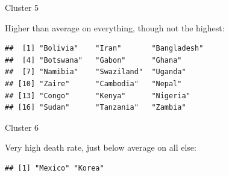 \begin{frame}[fragile]{Cluster 5}

  Higher than average on everything, though not the highest:
  
\begin{knitrout}
\color{fgcolor}\begin{kframe}
\begin{alltt}
\hlstd{(vital.s,country[clus6}\hlopt{==}\hlstd{])}
\end{alltt}
\begin{verbatim}
##  [1] "Bolivia"    "Iran"       "Bangladesh"
##  [4] "Botswana"   "Gabon"      "Ghana"     
##  [7] "Namibia"    "Swaziland"  "Uganda"    
## [10] "Zaire"      "Cambodia"   "Nepal"     
## [13] "Congo"      "Kenya"      "Nigeria"   
## [16] "Sudan"      "Tanzania"   "Zambia"
\end{verbatim}
\end{kframe}
\end{knitrout}
  
\end{frame}
\begin{frame}[fragile]{Cluster 6}

    Very high death rate, just below average on all else:

  
\begin{knitrout}
\color{fgcolor}\begin{kframe}
\begin{alltt}
\hlstd{(vital.s,country[clus6}\hlopt{==}\hlstd{])}
\end{alltt}
\begin{verbatim}
## [1] "Mexico" "Korea"
\end{verbatim}
\end{kframe}
\end{knitrout}
  
\end{frame}

